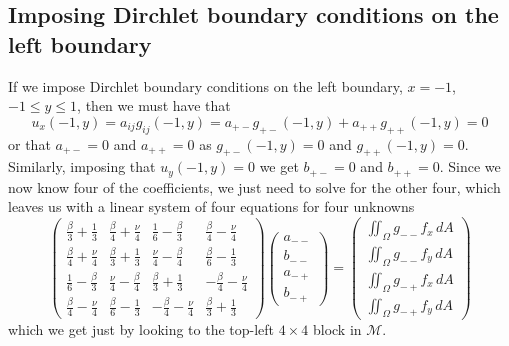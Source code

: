 \documentclass[11pt]{article}
\begin{document}
\subsection{Imposing Dirchlet boundary conditions on the left boundary}
If we impose Dirchlet boundary conditions on the left boundary, $x=-1$, $-1 \le y \le 1$, then we must have that
\begin{equation*}
u_x(-1,y) = a_{ij}g_{ij}(-1,y) = a_{+-}g_{+-}(-1,y) + a_{++}g_{++}(-1,y) = 0
\end{equation*}
or that $a_{+-} = 0$ and $a_{++} = 0$ as $g_{+-}(-1,y) = 0$ and $g_{++}(-1,y) = 0$. Similarly, imposing that $u_y(-1,y) = 0$ we get $b_{+-} = 0$ and $b_{++} = 0$. Since we now know four of the coefficients, we just need to solve for the other four, which leaves us with a linear system of four equations for four unknowns
\begin{equation} \label{eq:q2a4x4}
\begin{pmatrix}
	\frac{\beta}{3} + \frac{1}{3} &   \frac{\beta}{4} + \frac{\nu}{4} & \frac{1}{6} - \frac{\beta}{3} &   \frac{\beta}{4} - \frac{\nu}{4} \\
	\frac{\beta}{4} + \frac{\nu}{4} & \frac{\beta}{3} + \frac{1}{3} &   \frac{\nu}{4} - \frac{\beta}{4} & \frac{\beta}{6} - \frac{1}{3} \\
	\frac{1}{6} - \frac{\beta}{3} &   \frac{\nu}{4} - \frac{\beta}{4} & \frac{\beta}{3} + \frac{1}{3} & - \frac{\beta}{4} - \frac{\nu}{4} \\
	\frac{\beta}{4} - \frac{\nu}{4} & \frac{\beta}{6} - \frac{1}{3} & - \frac{\beta}{4} - \frac{\nu}{4} & \frac{\beta}{3} + \frac{1}{3}
\end{pmatrix}
\begin{pmatrix}
	a_{--} \\
	b_{--} \\
	a_{-+} \\
	b_{-+}
\end{pmatrix}
=
\begin{pmatrix}
	\iint_\Omega g_{--} f_x \, dA \\
	\iint_\Omega g_{--} f_y \, dA \\
	\iint_\Omega g_{-+} f_x \, dA \\
	\iint_\Omega g_{-+} f_y \, dA
\end{pmatrix}
\end{equation}
which we get just by looking to the top-left $4\times4$ block in $\mathcal{M}$.
\end{document}
